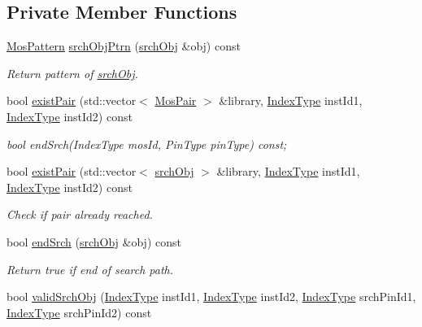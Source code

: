 \subsection*{Private Member Functions}
\begin{DoxyCompactItemize}
\item 
\hyperlink{type_8h_af19eddb079bfea723256710b029c38e8}{Mos\+Pattern} \hyperlink{classSymDetect_a54a184f22f3f445e694d1748a8a07750}{srch\+Obj\+Ptrn} (\hyperlink{structSymDetect_1_1srchObj}{srch\+Obj} \&obj) const
\begin{DoxyCompactList}\small\item\em Return pattern of \hyperlink{structSymDetect_1_1srchObj}{srch\+Obj}. \end{DoxyCompactList}\item 
bool \hyperlink{classSymDetect_a245b48760c705d4ad9b2bad39012030e}{exist\+Pair} (std\+::vector$<$ \hyperlink{structMosPair}{Mos\+Pair} $>$ \&library, \hyperlink{type_8h_a581e8093e28e7362f2b6937296190676}{Index\+Type} inst\+Id1, \hyperlink{type_8h_a581e8093e28e7362f2b6937296190676}{Index\+Type} inst\+Id2) const
\begin{DoxyCompactList}\small\item\em bool end\+Srch(\+Index\+Type mos\+Id, Pin\+Type pin\+Type) const; \end{DoxyCompactList}\item 
bool \hyperlink{classSymDetect_a821c77fb04532c8fb6a6f2f26c51bebf}{exist\+Pair} (std\+::vector$<$ \hyperlink{structSymDetect_1_1srchObj}{srch\+Obj} $>$ \&library, \hyperlink{type_8h_a581e8093e28e7362f2b6937296190676}{Index\+Type} inst\+Id1, \hyperlink{type_8h_a581e8093e28e7362f2b6937296190676}{Index\+Type} inst\+Id2) const
\begin{DoxyCompactList}\small\item\em Check if pair already reached. \end{DoxyCompactList}\item 
bool \hyperlink{classSymDetect_a508bad6a5f3aa1ce4978761289af9962}{end\+Srch} (\hyperlink{structSymDetect_1_1srchObj}{srch\+Obj} \&obj) const
\begin{DoxyCompactList}\small\item\em Return true if end of search path. \end{DoxyCompactList}\item 
bool \hyperlink{classSymDetect_ad4636f69ae0cad2fc23be2472c59ff4c}{valid\+Srch\+Obj} (\hyperlink{type_8h_a581e8093e28e7362f2b6937296190676}{Index\+Type} inst\+Id1, \hyperlink{type_8h_a581e8093e28e7362f2b6937296190676}{Index\+Type} inst\+Id2, \hyperlink{type_8h_a581e8093e28e7362f2b6937296190676}{Index\+Type} srch\+Pin\+Id1, \hyperlink{type_8h_a581e8093e28e7362f2b6937296190676}{Index\+Type} srch\+Pin\+Id2) const

\end{DoxyCompactItemize}
